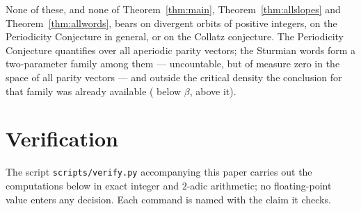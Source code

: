 \documentclass[11pt,reqno]{amsart}
\theoremstyle{plain}
\theoremstyle{definition}
\begin{document}
None of these, and none of Theorem~\ref{thm:main},
Theorem~\ref{thm:allslopes} and Theorem~\ref{thm:allwords}, bears on divergent
orbits of positive integers, on the Periodicity Conjecture in general, or on the
Collatz conjecture. The Periodicity Conjecture quantifies over all aperiodic
parity vectors; the Sturmian words form a two-parameter family among them ---
uncountable, but of measure zero in the space of all parity vectors --- and
outside the critical density the conclusion for that family was already
available
(\cite[Theorem~2.7(b)]{MonksYazinski2004} below $\beta$,
\cite[Theorem~1]{LopezStoll2021} above it).

\appendix

\section{Verification}\label{app:verify}

The script \texttt{scripts/verify.py} accompanying this paper carries out the
computations below in exact integer and $2$-adic arithmetic; no floating-point
value enters any decision. Each command is named with the claim it checks.
\end{document}

